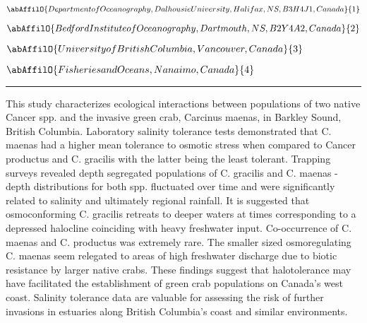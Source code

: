 \begin{center}
   \vspace{2 mm} \begin{center}
    \vspace{2 mm}\begin{center}
  
  $\abAffilO{Department of Oceanography, Dalhousie University, Halifax, NS, B3H 4J1, Canada}{1}$

  
  $\abAffilO{Bedford Institute of Oceanography, Dartmouth, NS, B2Y 4A2, Canada}{2}$

  
  $\abAffilO{University of British Columbia, Vancouver, Canada}{3}$

  
  $\abAffilO{Fisheries and Oceans, Nanaimo, Canada}{4}$

  \end{center}
  \vspace{2 mm}
  \end{center}\end{center}
  \begin{center}\rule{0.70\linewidth}{0.5 pt}\end{center}

\noindent This study characterizes ecological interactions between populations of two native Cancer spp. and the invasive green crab, Carcinus maenas, in Barkley Sound, British Columbia. Laboratory salinity tolerance tests demonstrated that C. maenas had a higher mean tolerance to osmotic stress when compared to Cancer productus and C. gracilis with the latter being the least tolerant. Trapping surveys revealed depth segregated populations of C. gracilis and C. maenas - depth distributions for both spp. fluctuated over time and were significantly related to salinity and ultimately regional rainfall. It is suggested that osmoconforming C. gracilis retreats to deeper waters at times corresponding to a depressed halocline coinciding with heavy freshwater input. Co-occurrence of C. maenas and C. productus was extremely rare. The smaller sized osmoregulating C. maenas seem relegated to areas of high freshwater discharge due to biotic resistance by larger native crabs. These findings suggest that halotolerance may have facilitated the establishment of green crab populations on Canada's west coast. Salinity tolerance data are valuable for assessing the risk of further invasions in estuaries along British Columbia's coast and similar environments.

